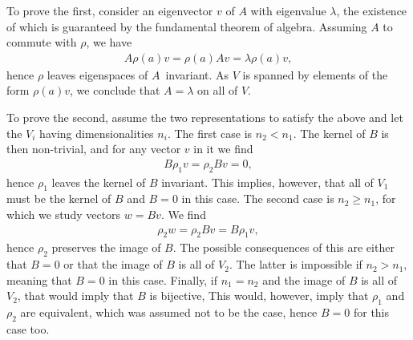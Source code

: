 To prove the first, consider an eigenvector $v$ of $A$ with eigenvalue $\lambda$, the existence of which is guaranteed by the fundamental theorem of algebra. Assuming $A$ to commute with $\rho$, we have
\begin{align*}
	A\rho(a)v = \rho(a)Av = \lambda\rho(a)v,
\end{align*}
hence $\rho$ leaves eigenspaces of $A$ invariant. As $V$ is spanned by elements of the form $\rho(a)v$, we conclude that $A = \lambda$ on all of $V$.

To prove the second, assume the two representations to satisfy the above and let the $V_{i}$ having dimensionalities $n_{i}$. The first case is $n_{2} < n_{1}$. The kernel of $B$ is then non-trivial, and for any vector $v$ in it we find
\begin{align*}
	B\rho_{1}v = \rho_{2}Bv = 0,
\end{align*}
hence $\rho_{1}$ leaves the kernel of $B$ invariant. This implies, however, that all of $V_{1}$ must be the kernel of $B$ and $B = 0$ in this case. The second case is $n_{2} \geq n_{1}$, for which we study vectors $w = Bv$. We find
\begin{align*}
	\rho_{2}w = \rho_{2}Bv = B\rho_{1}v,
\end{align*}
hence $\rho_{2}$ preserves the image of $B$. The possible consequences of this are either that $B = 0$ or that the image of $B$ is all of $V_{2}$. The latter is impossible if $n_{2} > n_{1}$, meaning that $B = 0$ in this case. Finally, if $n_{1} = n_{2}$ and the image of $B$ is all of $V_{2}$, that would imply that $B$ is bijective, This would, however, imply that $\rho_{1}$ and $\rho_{2}$ are equivalent, which was assumed not to be the case, hence $B = 0$ for this case too.

